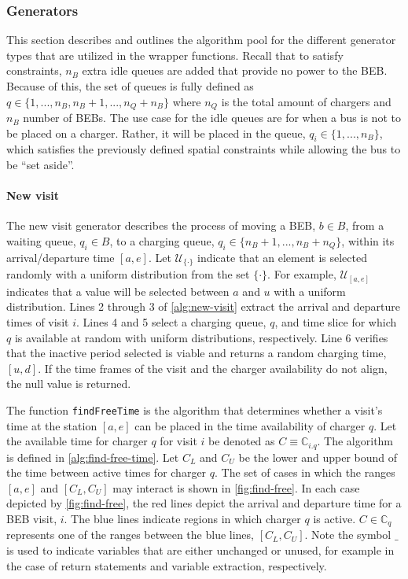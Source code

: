 \documentclass[11pt,a4paper,final]{article}
\newcommand{\C}{\mathbb{C}}                 %
\newcommand{\U}{\mathcal{U}}                %
\begin{document}
\subsubsection{Generators}
\label{sec:generators}
This section describes and outlines the algorithm pool for the different generator types that are utilized in the
wrapper functions. Recall that to satisfy constraints, \(n_B\) extra idle queues are added that provide no power to the
BEB. Because of this, the set of queues is fully defined as \(q \in \{1,..., n_B, n_B+1,..., n_Q+n_B\}\) where \(n_Q\) is the
total amount of chargers and \(n_B\) number of BEBs. The use case for the idle queues are for when a bus is not to be
placed on a charger. Rather, it will be placed in the queue, \(q_i \in \{1,..., n_B\}\), which satisfies the previously
defined spatial constraints while allowing the bus to be ``set aside''.

\paragraph{New visit}
\label{sec:new-visit}
The new visit generator describes the process of moving a BEB, \(b \in B\), from a waiting queue, \(q_i \in B\), to a charging
queue, \(q_i \in \{n_B+1,..., n_B + n_Q\}\), within its arrival/departure time \([a, e]\). Let \(\U_{\{\cdot\}}\) indicate that an
element is selected randomly with a uniform distribution from the set \(\{\cdot\}\). For example, \(\U_{[a, e]}\) indicates that
a value will be selected between \(a\) and \(u\) with a uniform distribution. Lines 2 through 3 of \ref{alg:new-visit}
extract the arrival and departure times of visit \(i\). Lines 4 and 5 select a charging queue, \(q\), and time slice for
which \(q\) is available at random with uniform distributions, respectively. Line 6 verifies that the inactive period
selected is viable and returns a random charging time, \([u, d]\). If the time frames of the visit and the charger
availability do not align, the null value is returned.

The function \texttt{findFreeTime} is the algorithm that determines whether a visit's time at the station \([a, e]\) can be placed
in the time availability of charger \(q\). Let the available time for charger \(q\) for visit \(i\) be denoted as \(C \equiv
\C_{i.q}\). The algorithm is defined in \ref{alg:find-free-time}. Let \(C_L\) and \(C_U\) be the lower and upper bound of the
time between active times for charger \(q\). The set of cases in which the ranges \([a, e]\) and \([C_L, C_U]\) may interact
is shown in \ref{fig:find-free}. In each case depicted by \ref{fig:find-free}, the red lines depict the arrival and departure time
for a BEB visit, \(i\). The blue lines indicate regions in which charger \(q\) is active. \(C \in \C_q\) represents one of the
ranges between the blue lines, \([C_L, C_U]\). Note the symbol \(\_\) is used to indicate variables that are either
unchanged or unused, for example in the case of return statements and variable extraction, respectively.
\end{document}
